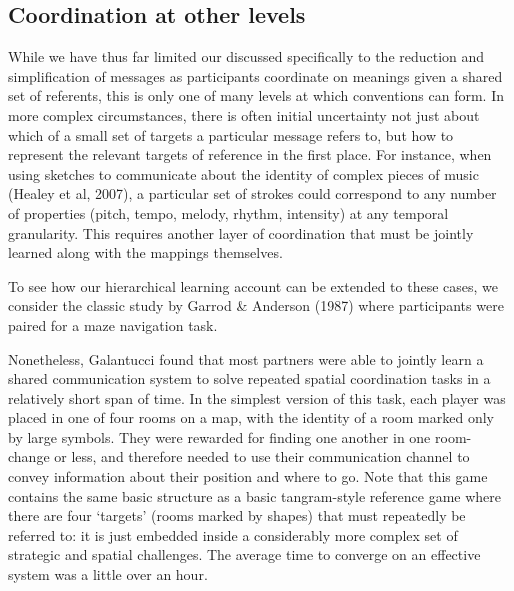 \documentclass[11pt, floatsintext, jou]{apa6}
\begin{document}
\subsection{Coordination at other levels}

While we have thus far limited our discussed specifically to the reduction and simplification of messages as participants coordinate on meanings given a shared set of referents, this is only one of many levels at which conventions can form. In more complex circumstances, there is often initial uncertainty not just about which of a small set of targets a particular message refers to, but how to represent the relevant targets of reference in the first place. For instance, when using sketches to communicate about the identity of complex pieces of music (Healey et al, 2007), a particular set of strokes could correspond to any number of properties (pitch, tempo, melody, rhythm, intensity) at any temporal granularity. This requires another layer of coordination that must be jointly learned along with the mappings themselves. 

To see how our hierarchical learning account can be extended to these cases, we consider the classic study by Garrod \& Anderson (1987) where participants were paired for a maze navigation task. 


Nonetheless, Galantucci found that most partners were able to jointly learn a shared communication system to solve repeated spatial coordination tasks in a relatively short span of time. In the simplest version of this task, each player was placed in one of four rooms on a map, with the identity of a room marked only by large symbols. They were rewarded for finding one another in one room-change or less, and therefore needed to use their communication channel to convey information about their position and where to go. Note that this game contains the same basic structure as a basic tangram-style reference game where there are four `targets' (rooms marked by shapes) that must repeatedly be referred to: it is just embedded inside a considerably more complex set of strategic and spatial challenges. The average time to converge on an effective system was a little over an hour. 
\end{document}

